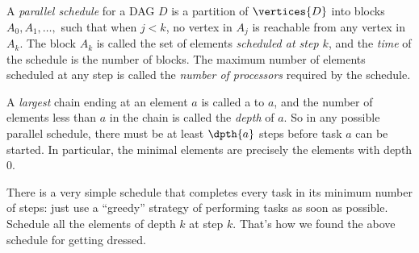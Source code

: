 \begin{definition}\label{def:schedule}
A \emph{parallel schedule} for a DAG $D$ is a partition of
$\vertices{D}$ into blocks $A_0, A_1,\dots,$ such that when $j < k$,
no vertex in $A_j$ is reachable from any vertex in $A_k$.  The block
$A_k$ is called the set of elements \emph{scheduled at step $k$}, and
the \emph{time} of the schedule is the number of blocks.  The
maximum number of elements scheduled at any step is called the
\emph{number of processors} required by the schedule.
\end{definition}

\iffalse

So the schedule we chose above for clothes has four steps
\begin{align*}
A_0 = & \set{\text{leftsock, rightsock, underwear, shirt}},\\
A_1 = & \set{\text{pants, sweater}},\\
A_2 = & \set{\text{leftshoe, rightshoe, belt}},\\
A_3 = & \set{\text{jacket}}.
\end{align*}
and requires four processors (to complete the first step).

Notice that the dependencies constrain the tasks underwear, pants,
belt, and jacket to be done in sequence.  This implies
that at least four steps are needed in \emph{every} schedule for
getting dressed, since if we used fewer than four steps, two of these
tasks would have to be scheduled at the same time.  A set of tasks
that must be done in sequence like this is called a \emph{chain}.

\begin{definition}
A \term{chain} a set of vertices in a DAG such that any two different
vertices in the set are comparable, meaning there is a walk from one
to the other\footnote{We'll define this term with slightly more
  technical vocabulary in Def.~\ref{def:path_total}, but the concept
  is fairly intuitive}.  A chain is said to \emph{end at} its maximum element.
\end{definition}
\fi

A \emph{largest} chain ending at an element $a$ is called a
 to $a$, and the number of elements less than $a$
in the chain is called the \emph{depth} of $a$.  So in any possible
parallel schedule, there must be at least $\dpth{a}$ steps before task
$a$ can be started.  In particular, the minimal elements are precisely
the elements with depth 0.

There is a very simple schedule that completes every task in its
minimum number of steps: just use a ``greedy'' strategy of performing
tasks as soon as possible.  Schedule all the elements of depth
$k$ at step $k$.  That's how we found the above schedule for getting dressed.

